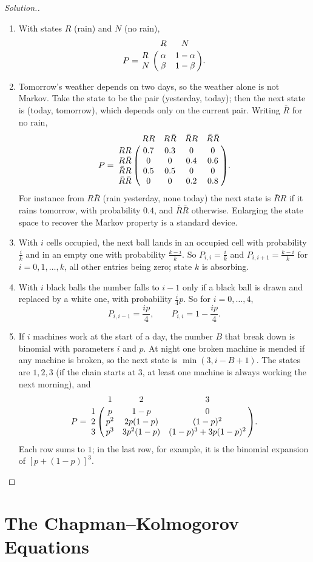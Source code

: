 \documentclass[12pt,a4paper]{report}
\theoremstyle{definition}
\newenvironment{solution}
  {\renewcommand{\qedsymbol}{}\begin{proof}[\textit{Solution}.]}
  {\end{proof}}
\begin{document}
\begin{solution}
\begin{enumerate}
\item[(a)] With states $R$ (rain) and $N$ (no rain),
\[P = \bordermatrix{~ & R & N\cr R & \alpha & 1 - \alpha\cr N & \beta & 1 - \beta\cr} .\]
\item[(b)] Tomorrow's weather depends on two days, so the weather alone is not Markov. Take
the state to be the pair (yesterday, today); then the next state is (today, tomorrow), which
depends only on the current pair. Writing $\bar R$ for no rain,
\[P = \bordermatrix{~ & RR & R\bar R & \bar RR & \bar R\bar R\cr
RR & 0.7 & 0.3 & 0 & 0\cr
R\bar R & 0 & 0 & 0.4 & 0.6\cr
\bar RR & 0.5 & 0.5 & 0 & 0\cr
\bar R\bar R & 0 & 0 & 0.2 & 0.8\cr} .\]
For instance from $R\bar R$ (rain yesterday, none today) the next state is $\bar RR$ if it rains
tomorrow, with probability $0.4$, and $\bar R\bar R$ otherwise. Enlarging the state space to
recover the Markov property is a standard device.
\item[(c)] With $i$ cells occupied, the next ball lands in an occupied cell with probability
$\frac ik$ and in an empty one with probability $\frac{k - i}{k}$. So
$P_{i,i} = \frac ik$ and $P_{i,i + 1} = \frac{k - i}{k}$ for $i = 0, 1, \dots, k$, all other entries
being zero; state $k$ is absorbing.
\item[(d)] With $i$ black balls the number falls to $i - 1$ only if a black ball is drawn and
replaced by a white one, with probability $\frac i4p$. So for $i = 0, \dots, 4$,
\[P_{i,i - 1} = \frac{ip}{4},\qquad P_{i,i} = 1 - \frac{ip}{4} .\]
\item[(e)] If $i$ machines work at the start of a day, the number $B$ that break down is
binomial with parameters $i$ and $p$. At night one broken machine is mended if any machine is
broken, so the next state is $\min(3, i - B + 1)$. The states are $1, 2, 3$ (if the chain
starts at $3$, at least one machine is always working the next morning), and
\[P = \bordermatrix{~ & 1 & 2 & 3\cr
1 & p & 1 - p & 0\cr
2 & p^2 & 2p(1 - p) & (1 - p)^2\cr
3 & p^3 & 3p^2(1 - p) & (1 - p)^3 + 3p(1 - p)^2\cr} .\]
Each row sums to $1$; in the last row, for example, it is the binomial expansion of
$\left[p + (1 - p)\right]^3$.
\end{enumerate}
\end{solution}

\section{The Chapman--Kolmogorov Equations}
\end{document}
